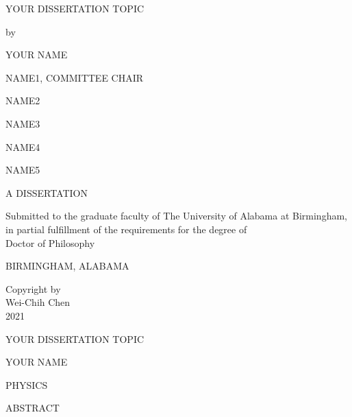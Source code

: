 	\frontmatter
    \begin{singlespace}
	{\centering
		YOUR DISSERTATION TOPIC\par
	}
	\vskip 72pt
	{\centering
		by \par
	}
	\vskip 12pt
	{\centering
		YOUR NAME
	\par
	}
	\vskip 24pt
	{\centering
		NAME1, COMMITTEE CHAIR
	\par
	}

	{\centering
		NAME2
	\par
	}
	{\centering
		NAME3
	\par
	}
	{\centering
		NAME4
	\par
	}
	{\centering
		NAME5
	\par
	}
	\vspace{204pt}%
	{\centering
		A DISSERTATION
	\par
	}
	\vskip 12pt
	{\centering
		Submitted to the graduate faculty of The University of Alabama at Birmingham,\\
		in partial fulfillment of the requirements for the degree of\\ 
		Doctor of Philosophy
	\par
	}
	\vskip 12pt
	{\centering
		BIRMINGHAM, ALABAMA
	\par
	}
	\vskip 12pt		
	{
	\par
	}
    \end{singlespace}
    


    \begin{singlespace}
	{\centering
		Copyright by\\
		Wei-Chih Chen\\
		2021\par
	}
    \end{singlespace}
	\restoregeometry
	\pagestyle{plain} %
		{\centering
		\singlespacing
			YOUR DISSERTATION TOPIC\par
		}
		\vskip 12pt
		{\centering
			YOUR NAME\par
		}
		\vskip 12pt
		{\centering
			PHYSICS\par
		}
		\vskip 12pt
		{\centering
			ABSTRACT\par
		}
		\vskip 12pt
        \lipsum[3-4]

